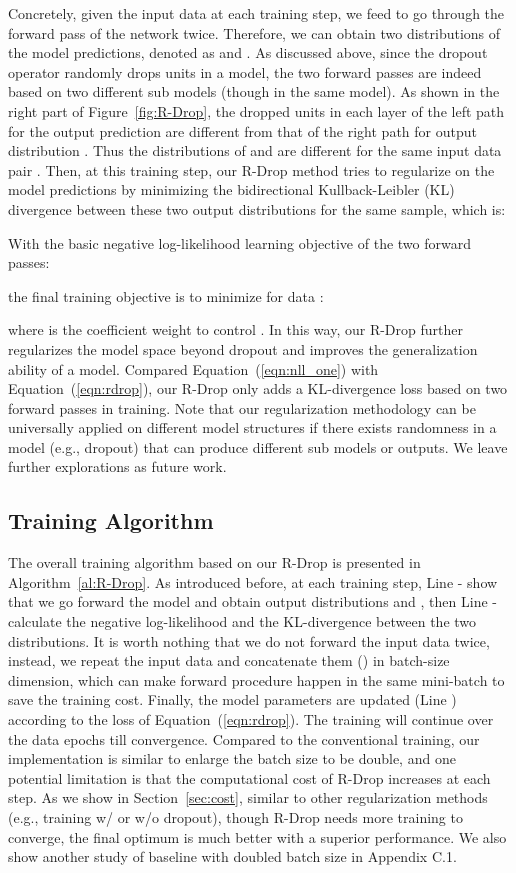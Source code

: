 \documentclass{article}
\begin{document}
Concretely, given the input data  at each training step, we feed  to go through the forward pass of the network twice. 
Therefore, we can obtain two distributions of the model predictions, denoted as  and . 
As discussed above, since the dropout operator randomly drops units in a model, the two forward passes are indeed based on two different sub models (though in the same model). 
As shown in the right part of Figure~\ref{fig:R-Drop}, the dropped units in each layer of the left path for the output prediction  are different from that of the right path for output distribution . 
Thus the distributions of  and  are different for the same input data pair . 
Then, at this training step, our R-Drop method tries to regularize on the model predictions by minimizing the bidirectional Kullback-Leibler (KL) divergence between these two output distributions for the same sample, which is:

With the basic negative log-likelihood learning objective  of the two forward passes:

the final training objective is to minimize  for data :

where  is the coefficient weight to control .
In this way, our R-Drop further regularizes the model space beyond dropout and improves the generalization ability of a model. 
Compared Equation~(\ref{eqn:nll_one}) with Equation~(\ref{eqn:rdrop}), our R-Drop only adds a KL-divergence loss  based on two forward passes in training. 
Note that our regularization methodology can be universally applied on different model structures if there exists randomness in a model (e.g., dropout) that can produce different sub models or outputs. We leave further explorations as future work.

\subsection{Training Algorithm}
\label{sec:train_algorithm}
The overall training algorithm based on our R-Drop is presented in Algorithm~\ref{al:R-Drop}.
As introduced before, at each training step, Line - show that we go forward the model and obtain output distributions  and , then Line - calculate the negative log-likelihood and the KL-divergence between the two distributions.
It is worth nothing that we do not forward the input data twice, instead, we repeat the input data  and concatenate them () in batch-size dimension, which can make forward procedure happen in the same mini-batch to save the training cost.
Finally, the model parameters are updated (Line ) according to the loss of Equation~(\ref{eqn:rdrop}).  The training will continue over the data epochs till convergence.
Compared to the conventional training, our implementation is similar to enlarge the batch size to be double, and one potential limitation is that the computational cost of R-Drop increases at each step. As we show in Section~\ref{sec:cost}, similar to other regularization methods (e.g., training w/ or w/o dropout), though R-Drop needs more training to converge, the final optimum is much better with a superior performance. We also show another study of baseline with doubled batch size in Appendix C.1. 
\end{document}
